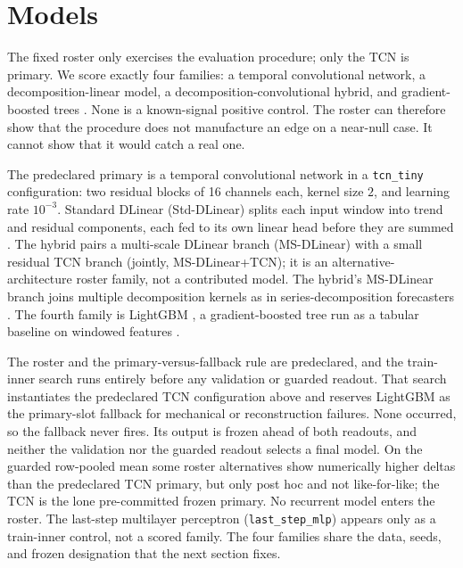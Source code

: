 \section{Models}

The fixed roster only exercises the evaluation procedure; only the TCN is primary. We score exactly four families: a temporal convolutional
network, a decomposition-linear model, a decomposition-convolutional hybrid, and
gradient-boosted trees
\cite{bai2018empirical,zeng2023dlinear,ke2017lightgbm,grinsztajn2022tree}. None
is a known-signal positive control. The roster can therefore show that the
procedure does not manufacture an edge on a near-null case. It cannot show that
it would catch a real one.

The predeclared primary is a temporal convolutional network
\cite{bai2018empirical} in a \texttt{tcn\_tiny} configuration: two residual
blocks of 16 channels each, kernel size \(2\), and learning rate \(10^{-3}\).
Standard DLinear (Std-DLinear) splits each input window into trend and residual components, each fed
to its own linear head before they are summed \cite{zeng2023dlinear}. The hybrid
pairs a multi-scale DLinear branch (MS-DLinear) with a small
residual TCN branch (jointly, MS-DLinear+TCN); it is an alternative-architecture
roster family, not a contributed model. The hybrid's MS-DLinear branch joins
multiple decomposition kernels as in
series-decomposition forecasters \cite{wu2021autoformer,zhou2022fedformer}. The fourth family is LightGBM \cite{ke2017lightgbm}, a gradient-boosted
tree run as a tabular baseline on windowed features \cite{grinsztajn2022tree}.

The roster and the primary-versus-fallback rule are predeclared, and the
train-inner search runs entirely before any validation or guarded readout. That
search instantiates the predeclared TCN configuration above and reserves LightGBM
as the primary-slot fallback for mechanical or reconstruction failures. None
occurred, so the fallback never fires. Its output is frozen ahead of both
readouts, and neither the validation nor the guarded readout selects a final
model. On the guarded row-pooled mean some roster alternatives show numerically
higher deltas than the predeclared TCN primary, but only post hoc and not
like-for-like; the TCN is the lone pre-committed frozen primary. No recurrent model enters the roster. The last-step multilayer perceptron
(\texttt{last\_step\_mlp}) appears only as a train-inner control, not a scored
family. The four families share the data, seeds, and frozen designation that the
next section fixes.

